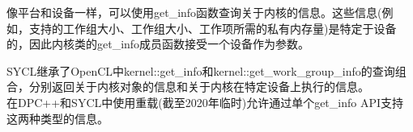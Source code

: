 像平台和设备一样，可以使用get\_info函数查询关于内核的信息。这些信息(例如，支持的工作组大小、工作组大小、工作项所需的私有内存量)是特定于设备的，因此内核类的get\_info成员函数接受一个设备作为参数。\par

\begin{tcolorbox}[colback=blue!5!white,colframe=blue!75!black, title=SYCL 1.2.1中的设备信息]
SYCL继承了OpenCL中kernel::get\_info和kernel::get\_work\_group\_info的查询组合，分别返回关于内核对象的信息和关于内核在特定设备上执行的信息。\\

在DPC++和SYCL中使用重载(截至2020年临时)允许通过单个get\_info API支持这两种类型的信息。
\end{tcolorbox}




































